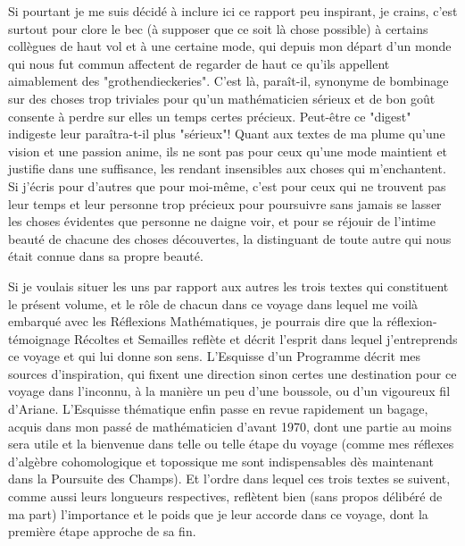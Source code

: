 Si pourtant je me suis décidé à inclure ici ce rapport peu inspirant, je crains, c'est surtout pour clore le bec (à supposer que ce soit là chose possible) à certains collègues de haut vol et à une certaine mode, qui depuis mon départ d'un monde qui nous fut commun affectent de regarder de haut ce qu'ils appellent aimablement des "grothendieckeries". C'est là, paraît-il, synonyme de bombinage sur des choses trop triviales pour qu'un mathématicien sérieux et de bon goût consente à perdre sur elles un temps certes précieux. Peut-être ce "digest" indigeste leur paraîtra-t-il plus "sérieux"! Quant aux textes de ma plume qu'une vision et une passion anime, ils ne sont pas pour ceux qu'une mode maintient et justifie dans une suffisance, les rendant insensibles aux choses qui m'enchantent. Si j'écris pour d'autres que pour moi-même, c'est pour ceux qui ne trouvent pas leur temps et leur personne trop précieux pour poursuivre sans jamais se lasser les choses évidentes que personne ne daigne voir, et pour se réjouir de l'intime beauté de chacune des choses découvertes, la distinguant de toute autre qui nous était connue dans sa propre beauté.

Si je voulais situer les uns par rapport aux autres les trois textes qui constituent le présent volume, et le rôle de chacun dans ce voyage dans lequel me voilà embarqué avec les Réflexions Mathématiques, je pourrais dire que la réflexion-témoignage Récoltes et Semailles reflète et décrit l'esprit dans lequel j'entreprends ce voyage et qui lui donne son sens. L'Esquisse d'un Programme décrit mes sources d'inspiration, qui fixent une direction sinon certes une destination pour ce voyage dans l'inconnu, à la manière un peu d'une boussole, ou d'un vigoureux fil d'Ariane. L'Esquisse thématique enfin passe en revue rapidement un bagage, acquis dans mon passé de mathématicien d'avant 1970, dont une partie au moins sera utile et la bienvenue dans telle ou telle étape du voyage (comme mes réflexes d'algèbre cohomologique et topossique me sont indispensables dès maintenant dans la Poursuite des Champs). Et l'ordre dans lequel ces trois textes se suivent, comme aussi leurs longueurs respectives, reflètent bien (sans propos délibéré de ma part) l'importance et le poids que je leur accorde dans ce voyage, dont la première étape approche de sa fin.



